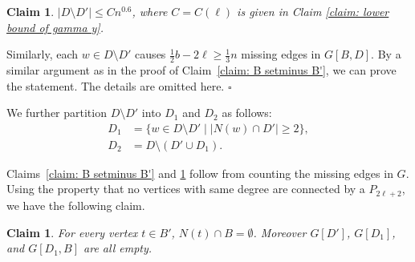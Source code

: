 \documentclass[12pt]{article}%
\newtheorem{claim}[theorem]{Claim}
\newenvironment{proof}{{\noindent\it Proof.}}{\hfill $\square$\par}
\begin{document}
\begin{claim}\label{claim: D setminus D'}
	$|D\setminus D'| \le C n^{0.6}$, where $C = C(\ell)$ is given in Claim \ref{claim: lower bound of gamma y}.
\end{claim}

\begin{proof}
	Similarly, each $w \in D\setminus D'$ causes $\frac{1}{2} b - 2\ell \ge \frac{1}{3}n$ missing edges in $G[B, D]$.
	By a similar argument as in the proof of Claim~\ref{claim: B setminus B'}, we can prove the statement.
	The details are omitted here.
\end{proof}

We further partition $D\setminus D'$ into $D_1$ and $D_2$ as follows:
\begin{equation*}
\begin{aligned}
	D_1 &= \{w \in D \setminus D' \mid \left|N(w) \cap D' \right| \ge 2 \},\\
	D_2 &= D \setminus (D' \cup D_1).
\end{aligned}
\end{equation*}

Claims~\ref{claim: B setminus B'} and \ref{claim: D setminus D'} follow from counting the missing edges in $G$.
Using the property that no vertices with same degree are connected by a $P_{2\ell+2}$, we have the following claim.

\begin{claim}\label{claim: empty sets}
	For every vertex $t \in B'$, $N(t)\cap B=\emptyset$. Moreover
	$G[D']$, $G[D_1]$, and $G[D_1,B]$ are all empty.
\end{claim}
\end{document}
